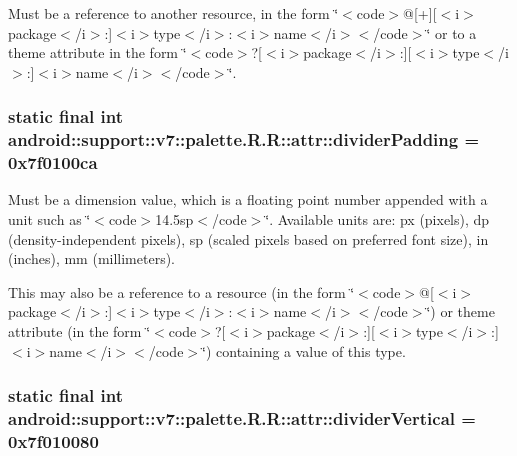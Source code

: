 Must be a reference to another resource, in the form \char`\"{}$<$code$>$@\mbox{[}+\mbox{]}\mbox{[}$<$i$>$package$<$/i$>$:\mbox{]}$<$i$>$type$<$/i$>$:$<$i$>$name$<$/i$>$$<$/code$>$\char`\"{} or to a theme attribute in the form \char`\"{}$<$code$>$?\mbox{[}$<$i$>$package$<$/i$>$:\mbox{]}\mbox{[}$<$i$>$type$<$/i$>$:\mbox{]}$<$i$>$name$<$/i$>$$<$/code$>$\char`\"{}. \hypertarget{classandroid_1_1support_1_1v7_1_1palette_1_1_r_1_1attr_5d67920c88de6ec165597d4870ce6e52}{
\subsubsection[{dividerPadding}]{\setlength{\rightskip}{0pt plus 5cm}static final int android::support::v7::palette.R.R::attr::dividerPadding = 0x7f0100ca}}
\label{classandroid_1_1support_1_1v7_1_1palette_1_1_r_1_1attr_5d67920c88de6ec165597d4870ce6e52}


Must be a dimension value, which is a floating point number appended with a unit such as \char`\"{}$<$code$>$14.5sp$<$/code$>$\char`\"{}. Available units are: px (pixels), dp (density-independent pixels), sp (scaled pixels based on preferred font size), in (inches), mm (millimeters). 

This may also be a reference to a resource (in the form \char`\"{}$<$code$>$@\mbox{[}$<$i$>$package$<$/i$>$:\mbox{]}$<$i$>$type$<$/i$>$:$<$i$>$name$<$/i$>$$<$/code$>$\char`\"{}) or theme attribute (in the form \char`\"{}$<$code$>$?\mbox{[}$<$i$>$package$<$/i$>$:\mbox{]}\mbox{[}$<$i$>$type$<$/i$>$:\mbox{]}$<$i$>$name$<$/i$>$$<$/code$>$\char`\"{}) containing a value of this type. \hypertarget{classandroid_1_1support_1_1v7_1_1palette_1_1_r_1_1attr_4f5ecb2477b9bc708dd8cc0c8ce05c9b}{
\subsubsection[{dividerVertical}]{\setlength{\rightskip}{0pt plus 5cm}static final int android::support::v7::palette.R.R::attr::dividerVertical = 0x7f010080}}
\label{classandroid_1_1support_1_1v7_1_1palette_1_1_r_1_1attr_4f5ecb2477b9bc708dd8cc0c8ce05c9b}


